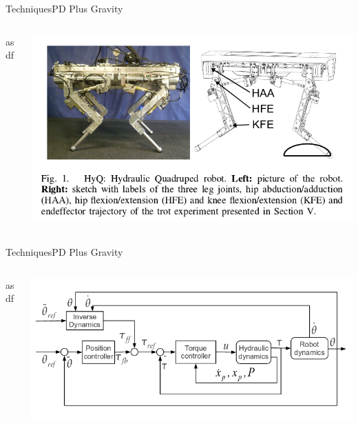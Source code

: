 \documentclass{beamer}
\begin{document}
\begin{frame}{Techniques}{PD Plus Gravity\cite{piltan}}
\begin{columns}
    \begin{column}{0.47\textwidth}
asdf
    \end{column}
    \begin{column}{0.5\textwidth}
        \includegraphics[scale=.2]{./images/quad_robot.png}
    \end{column}
\end{columns}
\end{frame}



\begin{frame}{Techniques}{PD Plus Gravity\cite{piltan}}
\begin{columns}
    \begin{column}{0.47\textwidth}
asdf
    \end{column}
    \begin{column}{0.5\textwidth}
        \includegraphics[scale=.2]{./images/dynamics.png}
    \end{column}
\end{columns}
\end{frame}
\end{document}
